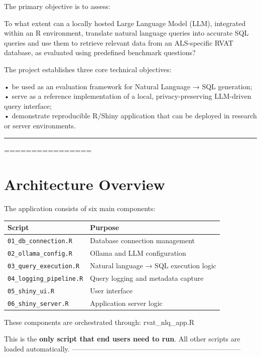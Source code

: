 \documentclass[
]{article}
\begin{document}
The primary objective is to assess:

To what extent can a locally hosted Large Language Model (LLM),
integrated within an R environment, translate natural language queries
into accurate SQL queries and use them to retrieve relevant data from an
ALS-specific RVAT database, as evaluated using predefined benchmark
questions?

The project establishes three core technical objectives:

• be used as an evaluation framework for Natural Language → SQL
generation;\\
• serve as a reference implementation of a local, privacy-preserving
LLM-driven query interface;\\
• demonstrate reproducible R/Shiny application that can be deployed in
research or server environments.\\

\begin{center}\rule{0.5\linewidth}{0.5pt}\end{center}

================

\section{Architecture Overview}\label{architecture-overview}

The application consists of six main components:

\begin{longtable}[]{@{}ll@{}}
\toprule\noalign{}
Script & Purpose \\
\midrule\noalign{}
\endhead
\bottomrule\noalign{}
\endlastfoot
\texttt{01\_db\_connection.R} & Database connection management \\
\texttt{02\_ollama\_config.R} & Ollama and LLM configuration \\
\texttt{03\_query\_execution.R} & Natural language → SQL execution
logic \\
\texttt{04\_logging\_pipeline.R} & Query logging and metadata capture \\
\texttt{05\_shiny\_ui.R} & User interface \\
\texttt{06\_shiny\_server.R} & Application server logic \\
\end{longtable}

These components are orchestrated through: rvat\_nlq\_app.R

This is the \textbf{only script that end users need to run}. All other
scripts are loaded automatically.
------------------------------------------------------------------------
\end{document}
